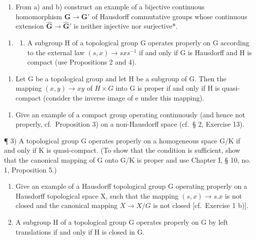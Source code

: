 \begin{enumerate}
\def\labelenumi{\alph{enumi})}
\setcounter{enumi}{2}
\tightlist
\item
  From a) and b) construct an example of a bijective continuous homomorphism \(\mathbf{G} \to \mathbf{G}'\) of Hausdorff commutative groups whose continuous extension \(\hat{\mathbf{G}} \to \hat{\mathbf{G}}'\) is neither injective nor surjective*.
\end{enumerate}

\BourbakiExerciseGroup

\begin{enumerate}
\def\labelenumi{\arabic{enumi})}
\tightlist
\item
  \begin{enumerate}
  \def\labelenumii{\alph{enumii})}
  \tightlist
  \item
    A subgroup H of a topological group G operates properly on G according to the external law \((s, x) \rightarrow sxs^{-1}\) if and only if G is Hausdorff and H is compact (use Propositions 2 and 4).
  \end{enumerate}
\end{enumerate}

\begin{enumerate}
\def\labelenumi{\alph{enumi})}
\setcounter{enumi}{1}
\tightlist
\item
  Let G be a topological group and let H be a subgroup of G. Then the mapping \((x,y)\to xy\) of \(H\times G\) into G is proper if and only if H is quasi-compact (consider the inverse image of e under this mapping).
\end{enumerate}

\begin{enumerate}
\def\labelenumi{\arabic{enumi})}
\setcounter{enumi}{1}
\tightlist
\item
  Give an example of a compact group operating continuously (and hence not properly, cf.~Proposition 3) on a non-Hausdorff space (cf.~§ 2, Exercise 13).
\end{enumerate}

¶ 3) A topological group G operates properly on a homogeneous space G/K if and only if K is quasi-compact. (To show that the condition is sufficient, show that the canonical mapping of G onto G/K is proper and use Chapter I, § 10, no. 1, Proposition 5.)

\begin{enumerate}
\def\labelenumi{\arabic{enumi})}
\setcounter{enumi}{3}
\item
  Give an example of a Hausdorff topological group G operating properly on a Hausdorff topological space X, such that the mapping \((s, x) \rightarrow s.x\) is not closed and the canonical mapping \(X \rightarrow X/G\) is not closed {[}cf.~Exercise 1 b){]}.
\item
  A subgroup H of a topological group G operates properly on G by left translations if and only if H is closed in G.
\end{enumerate}

